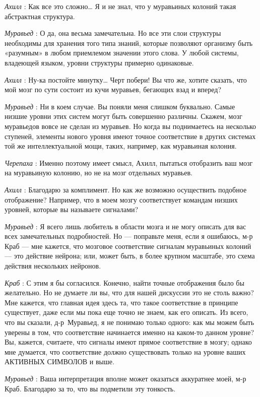 \documentclass[../main.tex]{subfiles}
\begin{document}
\begin{dialogue}
\emph{Ахилл} : Как все это сложно\ldots{} Я и не знал, что у муравьиных колоний такая абстрактная структура.

\emph{Муравьед} : О да, она весьма замечательна. Но все эти слои структуры необходимы для хранения того типа знаний, которые позволяют организму быть «разумным» в любом приемлемом значении этого слова. У любой системы, владеющей языком, уровни структуры примерно одинаковые.

\emph{Ахилл} : Ну-ка постойте минутку\ldots{} Черт побери! Вы что же, хотите сказать, что мой мозг по сути состоит из кучи муравьев, бегающих взад и вперед?

\emph{Муравьед} : Ни в коем случае. Вы поняли меня слишком буквально. Самые низшие уровни этих систем могут быть совершенно различны. Скажем, мозг муравьедов вовсе не сделан из муравьев. Но когда вы поднимаетесь на несколько ступеней, элементы нового уровня имеют точное соответствие в других системах той же интеллектуальной мощи, таких, например, как муравьиная колония.

\emph{Черепаха} : Именно поэтому имеет смысл, Ахилл, пытаться отобразить ваш мозг на муравьиную колонию, но не на мозг отдельных муравьев.

\emph{Ахилл} : Благодарю за комплимент. Но как же возможно осуществить подобное отображение? Например, что в моем мозгу соответствует командам низших уровней, которые вы называете сигналами?

\emph{Муравьед} : Я всего лишь любитель в области мозга и не могу описать для вас всех замечательных подробностей. Но --- поправьте меня, если я ошибаюсь, м-р Краб --- мне кажется, что мозговое соответствие сигналам муравьиных колоний --- это действие нейрона; или, может быть, в более крупном масштабе, это схема действия нескольких нейронов.

\emph{Краб} : С этим я бы согласился. Конечно, найти точные отображения было бы желательно. Но не думаете ли вы, что для нашей дискуссии это не столь важно? Мне кажется, что главная идея здесь та, что такое соответствие в принципе существует, даже если мы пока еще точно не знаем, как его описать. Из всего, что вы сказали, д-р~Муравьед, я не понимаю только одного: как мы можем быть уверены в том, что соответствие начинается именно на каком-то данном уровне? Вы, кажется, считаете, что сигналы имеют прямое соответствие в мозгу; однако мне думается, что соответствие должно существовать только на уровне ваших АКТИВНЫХ СИМВОЛОВ и выше.

\emph{Муравьед} : Ваша интерпретация вполне может оказаться аккуратнее моей, м-р Краб. Благодарю за то, что вы подметили эту тонкость.


\end{dialogue}
\end{document}

